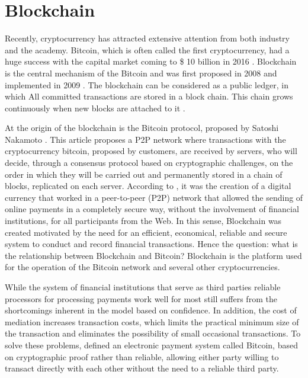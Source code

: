 \section{Blockchain}\label{sec:blockchain}
Recently, cryptocurrency has attracted extensive attention from both industry and the academy. Bitcoin, which is often called the first cryptocurrency, had a huge success with the capital market coming to \$ 10 billion in 2016 \cite{coindesk}. Blockchain is the central mechanism of the Bitcoin and was first proposed in 2008 and implemented in 2009 \cite{nakamoto2008bitcoin}. The blockchain can be considered as a public ledger, in which All committed transactions are stored in a block chain. This chain grows continuously when new blocks are attached to it \cite{zheng2016blockchain}.

At the origin of the blockchain is the Bitcoin protocol, proposed by Satoshi Nakamoto \cite{nakamoto2008bitcoin}. This article proposes a P2P network where transactions with the cryptocurrency bitcoin, proposed by customers, are received by servers, who will decide, through a consensus protocol based on cryptographic challenges, on the order in which they will be carried out and permanently stored in a chain of blocks, replicated on each server. According to , it was the creation of a digital currency that worked in a peer-to-peer (P2P) network that allowed the sending of online payments in a completely secure way, without the involvement of financial institutions, for all participants from the Web. In this sense, Blockchain was created motivated by the need for an efficient, economical, reliable and secure system to conduct and record financial transactions. Hence the question: what is the relationship between Blockchain and Bitcoin? Blockchain is the platform used for the operation of the Bitcoin network and several other cryptocurrencies.

While the system of financial institutions that serve as third parties reliable processors for processing payments work well for most still suffers from the shortcomings inherent in the model based on confidence. In addition, the cost of mediation increases transaction costs, which limits the practical minimum size of the transaction and eliminates the possibility of small occasional transactions. To solve these problems, \cite{nakamoto2008bitcoin} defined an electronic payment system called Bitcoin, based on cryptographic proof rather than reliable, allowing either party willing to transact directly with each other without the need to a reliable third party.

